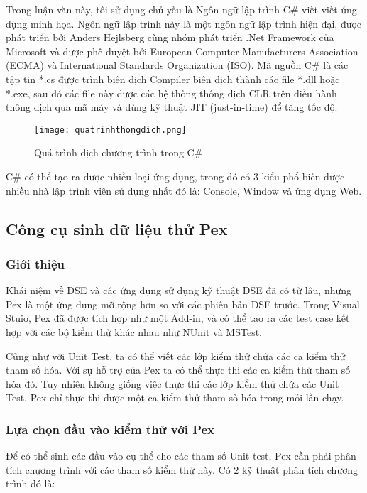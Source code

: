 Trong luận văn này, tôi sử dụng chủ yếu là Ngôn ngữ lập trình C\# viết viết ứng dụng minh họa. Ngôn ngữ lập trình này là một ngôn ngữ lập trình hiện đại, được phát triển bởi Anders Hejlsberg cùng nhóm phát triển .Net Framework của Microsoft và được phê duyệt bởi European Computer Manufacturers Association (ECMA) và International Standards Organization (ISO). Mã nguồn C\# là các tập tin *.cs được trình biên dịch Compiler biên dịch thành các file *.dll hoặc *.exe, sau đó các file này được các hệ thống thông dịch CLR trên điều hành thông dịch qua mã máy và dùng kỹ thuật JIT (just-in-time) để tăng tốc độ.

\begin{center}
	\begin{figure}[H]
		\begin{center}
			\texttt{[image: quatrinhthongdich.png]}
		\end{center}
		\caption{Quá trình dịch chương trình trong C\#}		
	\end{figure}
\end{center}

C\# có thể tạo ra được nhiều loại ứng dụng, trong đó có 3 kiểu phổ biến được nhiều nhà lập trình viên sử dụng nhất đó là: Console, Window và ứng dụng Web. 

\subsection{Công cụ sinh dữ liệu thử Pex}
\subsubsection*{Giới thiệu}
Khái niệm về DSE và các ứng dụng sử dụng kỹ thuật DSE đã có từ lâu, nhưng Pex là một ứng dụng mỡ rộng hơn so với các phiên bản DSE trước. Trong Visual Stuio, Pex đã được tích hợp như một Add-in, và có thể tạo ra các test case kết hợp với các bộ kiểm thử khác nhau như NUnit và MSTest. 

Cũng như với Unit Test, ta có thể viết các lớp kiểm thử chứa các ca kiểm thử tham số hóa. Với sự hỗ trợ của Pex ta có thể thực thi các ca kiểm thử tham số hóa đó. Tuy nhiên không giống việc thực thi các lớp kiểm thử chứa các Unit Test, Pex chỉ thực thi được một ca kiểm thử tham số hóa trong mỗi lần chạy.



\subsubsection*{Lựa chọn đầu vào kiểm thử với Pex}
Để có thể sinh các đầu vào cụ thể cho các tham số Unit test, Pex cần phải phân tích chương trình với các tham số kiểm thử này. Có 2 kỹ thuật phân tích chương trình đó là:

